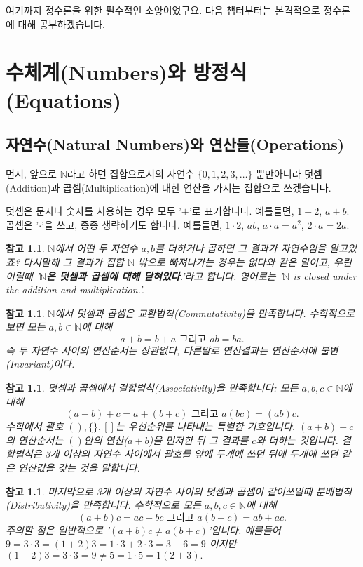 \documentclass[a4paper, 11pt]{report}
\renewcommand{\<}{\langle}
\renewcommand{\>}{\rangle}
\newtheorem{remark}[thm]{참고}
\begin{document}
여기까지 정수론을 위한 필수적인 소양이었구요. 다음 챕터부터는 본격적으로 정수론에 대해 공부하겠습니다.


\chapter{수체계(Numbers)와 방정식(Equations)}

\section{자연수(Natural Numbers)와 연산들(Operations)}

먼저, 앞으로 $\mathbb{N}$라고 하면 집합으로서의 자연수 $\{0, 1, 2, 3, \ldots\}$ 뿐만아니라 
덧셈(Addition)과 곱셈(Multiplication)에 대한 연산을 가지는 집합으로 쓰겠습니다. 

덧셈은 문자나 숫자를 사용하는 경우 모두 '$+$'로 표기합니다. 예를들면, $1 + 2$, $a + b$.
곱셈은 '$\cdot$'을 쓰고, 종종 생략하기도 합니다. 
예를들면, $1\cdot2$, $ab$, $a\cdot a = a^2$, $2\cdot a = 2a$.

\begin{remark}
  $\mathbb{N}$에서 어떤 두 자연수 $a, b$를 더하거나 곱하면 그 결과가 자연수임을 알고있죠?
  다시말해 그 결과가 집합 $\mathbb{N}$ 밖으로 빠져나가는 경우는 없다와 같은 말이고, 우린 
  이럴때 '\textbf{$\mathbb{N}$은 덧셈과 곱셈에 대해 닫혀있다}.'라고 합니다. 영어로는
  '$\mathbb{N}$ is closed under the addition and multiplication.'.
\end{remark}

\begin{remark}
  $\mathbb{N}$에서 덧셈과 곱셈은 교환법칙(Commutativity)을 만족합니다. 수학적으로 보면
  모든 $a, b \in \mathbb{N}$에 대해
  $$
  a + b = b + a \text{ 그리고 } ab = ba.
  $$
  즉 두 자연수 사이의 연산순서는 상관없다, 다른말로 연산결과는 연산순서에 불변(Invariant)이다.
\end{remark}

\begin{remark}
  덧셈과 곱셈에서 결합법칙(Associativity)을 만족합니다: 모든 $a, b, c \in \mathbb{N}$에 대해 
  $$
  (a+b)+c = a+(b+c) \text{ 그리고 } a(bc) = (ab)c.
  $$
  수학에서 괄호 $(), \{\}, []$는 우선순위를 나타내는 특별한 기호입니다. $(a+b)+c$의 연산순서는
  $()$안의 연산($a+b$)을 먼저한 뒤 그 결과를 $c$와 더하는 것입니다. 결합법칙은 3개 이상의
  자연수 사이에서 괄호를 앞에 두개에 쓰던 뒤에 두개에 쓰던 같은 연산값을 갖는 것을 말합니다. 
\end{remark}

\begin{remark}
  마지막으로 3개 이상의 자연수 사이의 덧셈과 곱셈이 같이쓰일때 분배법칙(Distributivity)을 만족합니다.
  수학적으로 모든 $a, b, c \in \mathbb{N}$에 대해 
  $$
  (a+b)c = ac+bc \text{ 그리고 } a(b+c) = ab + ac.
  $$
  주의할 점은 일반적으로 '$(a+b)c \neq a(b+c)$'입니다. 예를들어
  $9 = 3\cdot 3 = (1+2)3 = 1\cdot 3 + 2\cdot 3 = 3 + 6 = 9$
  이지만 $(1+2)3 = 3\cdot 3 = 9 \neq 5 = 1\cdot 5= 1(2+3).$
\end{remark}
\end{document}
